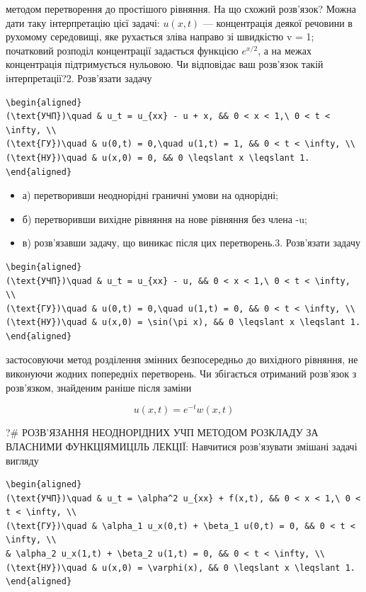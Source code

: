 \documentclass[
  ukrainian,
]{article}
\begin{document}
методом перетворення до простішого рівняння. На що схожий розв'язок?
Можна дати таку інтерпретацію цієї задачі: \(u(x,t)\) --- концентрація
деякої речовини в рухомому середовищі, яке рухається зліва направо зі
швидкістю v = 1; початковий розподіл концентрації задається функцією
\(e^{x/2}\), а на межах концентрація підтримується нульовою. Чи
відповідає ваш розв'язок такій інтерпретації?2. Розв'язати задачу

\begin{verbatim}
\begin{aligned}
(\text{УЧП})\quad & u_t = u_{xx} - u + x, && 0 < x < 1,\ 0 < t < \infty, \\
(\text{ГУ})\quad & u(0,t) = 0,\quad u(1,t) = 1, && 0 < t < \infty, \\
(\text{НУ})\quad & u(x,0) = 0, && 0 \leqslant x \leqslant 1.
\end{aligned}
\end{verbatim}

\begin{itemize}
\item
  а) перетворивши неоднорідні граничні умови на однорідні;
\item
  б) перетворивши вихідне рівняння на нове рівняння без члена -u;
\item
  в) розв'язавши задачу, що виникає після цих перетворень.3. Розв'язати
  задачу
\end{itemize}

\begin{verbatim}
\begin{aligned}
(\text{УЧП})\quad & u_t = u_{xx} - u, && 0 < x < 1,\ 0 < t < \infty, \\
(\text{ГУ})\quad & u(0,t) = 0,\quad u(1,t) = 0, && 0 < t < \infty, \\
(\text{НУ})\quad & u(x,0) = \sin(\pi x), && 0 \leqslant x \leqslant 1.
\end{aligned}
\end{verbatim}

застосовуючи метод розділення змінних безпосередньо до вихідного
рівняння, не виконуючи жодних попередніх перетворень. Чи збігається
отриманий розв'язок з розв'язком, знайденим раніше після заміни

\[
u(x,t) = e^{-t}w(x,t)
\]

?\# РОЗВ'ЯЗАННЯ НЕОДНОРІДНИХ УЧП МЕТОДОМ РОЗКЛАДУ ЗА ВЛАСНИМИ
ФУНКЦІЯМИЦІЛЬ ЛЕКЦІЇ: Навчитися розв'язувати змішані задачі вигляду

\begin{verbatim}
\begin{aligned}
(\text{УЧП})\quad & u_t = \alpha^2 u_{xx} + f(x,t), && 0 < x < 1,\ 0 < t < \infty, \\
(\text{ГУ})\quad & \alpha_1 u_x(0,t) + \beta_1 u(0,t) = 0, && 0 < t < \infty, \\
& \alpha_2 u_x(1,t) + \beta_2 u(1,t) = 0, && 0 < t < \infty, \\
(\text{НУ})\quad & u(x,0) = \varphi(x), && 0 \leqslant x \leqslant 1.
\end{aligned}
\end{verbatim}
\end{document}
